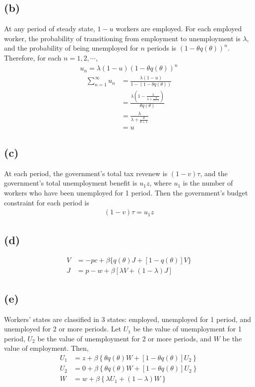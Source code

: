 \documentclass{ltjsarticle}
\begin{document}
\subsection*{(b)}
At any period of steady state, $1-u$ workers are employed. For each employed worker, the probability of transitioning from employment to unemployment is $\lambda$, and the probability of being unemployed for $n$ periods is $(1- \theta q(\theta))^n$. Therefore, for each $n=1,2,\cdots$, 
\begin{gather*}
  u_n = \lambda (1-u) (1- \theta q(\theta))^n
\end{gather*}
\begin{align*}
  \sum_{n=1}^{\infty} u_n
  &= \frac{\lambda (1-u)}{1 - (1- \theta q(\theta))}\\
  &= \frac{\lambda \left(1-\frac{\lambda}{\lambda + \frac{\theta}{\theta+1}}\right)}{\theta q(\theta)}\\
  &= \frac{\lambda}{\lambda + \frac{\theta}{\theta+1}}\\
  &= u
\end{align*}

\subsection*{(c)}

At each period, the government's total tax revenew is $(1-v)\tau$, and the government's total unemployment benefit is $u_1 z$, where $u_1$ is the number of workers who have been unemployed for 1 period. Then the government's budget constraint for each period is
\begin{gather*}
  (1-v)\tau = u_1 z
\end{gather*}

\subsection*{(d)}

\begin{align*}
  V &= -pc + \beta \{q(\theta)J + [1-q(\theta)]V \}\\
  J &= p - w + \beta[\lambda V + (1-\lambda)J]
\end{align*}

\subsection*{(e)}

Workers' states are classified in 3 states: employed, unemployed for 1 period, and unemployed for 2 or more periods. 
Let $U_1$ be the value of unemployment for 1 period, $U_2$ be the value of unemployment for 2 or more periods, and $W$ be the value of employment. Then,
\begin{align*}
  U_1 &= z + \beta \left\{ \theta q(\theta) W + [1-\theta q(\theta)] U_2 \right\}\\
  U_2 &= 0 + \beta \left\{ \theta q(\theta) W + [1-\theta q(\theta)] U_2 \right\}\\
  W &= w + \beta \left\{\lambda U_1 + (1-\lambda) W \right\}
\end{align*}
\end{document}
